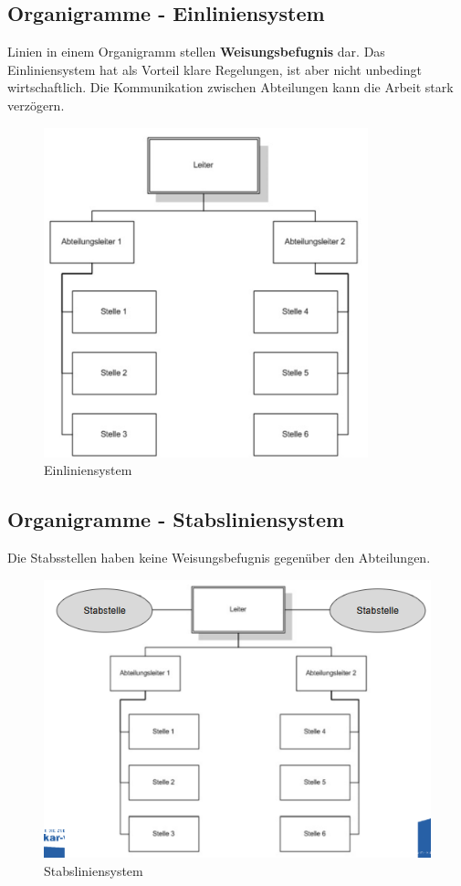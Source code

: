 \documentclass[]{article}
\begin{document}
\subsection{Organigramme - Einliniensystem}
Linien in einem Organigramm stellen \textbf{Weisungsbefugnis} dar. Das Einliniensystem hat als Vorteil klare Regelungen, ist aber nicht unbedingt wirtschaftlich. Die Kommunikation zwischen Abteilungen kann die Arbeit stark verzögern. 

\begin{figure}[h!]
	\centering
	\includegraphics[width=0.7\linewidth]{"assetes/Organigramm - Einliniensystem"}
	\caption{Einliniensystem}
	\label{fig:organigramm---einliniensystem}
\end{figure}

\subsection{Organigramme - Stabsliniensystem}
Die Stabsstellen haben keine Weisungsbefugnis gegenüber den Abteilungen.
\begin{figure}[h!]
	\centering
	\includegraphics[width=0.7\linewidth]{"assetes/Organigramm - Stabsliniensystem"}
	\caption{Stabsliniensystem}
	\label{fig:organigramm---stabsliniensystem}
\end{figure}
\end{document}
